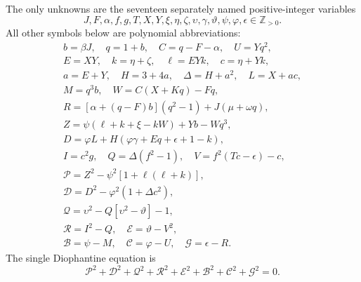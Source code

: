 The only unknowns are the seventeen separately named positive-integer variables
\[
J,F,\alpha,f,g,T,X,Y,\xi,\eta,\zeta,\upsilon,\gamma,\vartheta,\psi,\varphi,\epsilon\in\mathbb Z_{>0}.
\]
All other symbols below are polynomial abbreviations:
\[
\begin{gathered}
b=\beta J,\quad q=1+b,\quad C=q-F-\alpha,\quad U=Yq^2,\\
E=XY,\quad k=\eta+\zeta,\quad \ell=EYk,\quad c=\eta+Yk,\\
a=E+Y,\quad H=3+4a,\quad\Delta=H+a^2,\quad L=X+ac,\\
M=q^3b,\quad W=C(X+Kq)-Fq,\\
R=[\alpha+(q-F)b](q^2-1)+J(\mu+\omega q),\\
Z=\psi(\ell+k+\xi-kW)+Yb-Wq^3,\\
D=\varphi L+H(\varphi\gamma+Eq+\epsilon+1-k),\\
I=c^2g,\quad Q=\Delta(f^2-1),\quad V=f^2(Tc-\epsilon)-c,\\
\mathcal{P}=Z^2-\psi^2[1+\ell(\ell+k)],\\
\mathcal{D}=D^2-\varphi^2(1+\Delta c^2),\\
\mathcal{Q}=\upsilon^2-Q[\upsilon^2-\vartheta]-1,\\
\mathcal{R}=I^2-Q,\quad \mathcal{E}=\vartheta-V^2,\\
\mathcal{B}=\psi-M,\quad \mathcal{C}=\varphi-U,\quad \mathcal{G}=\epsilon-R.
\end{gathered}
\]
The single Diophantine equation is
\[
\boxed{\mathcal{P}^2+\mathcal{D}^2+\mathcal{Q}^2+\mathcal{R}^2+\mathcal{E}^2+\mathcal{B}^2+\mathcal{C}^2+\mathcal{G}^2=0.}
\]
